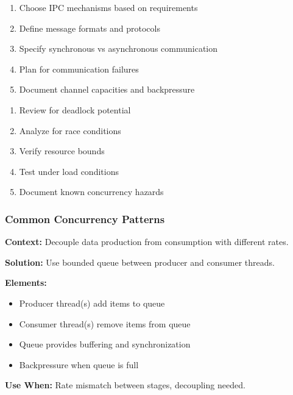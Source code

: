 \documentclass[11pt,letterpaper]{article}
\begin{document}
\begin{guidancebox}
\begin{enumerate}[nosep]
    \item Choose IPC mechanisms based on requirements
    \item Define message formats and protocols
    \item Specify synchronous vs asynchronous communication
    \item Plan for communication failures
    \item Document channel capacities and backpressure
\end{enumerate}
\end{guidancebox}

\begin{guidancebox}
\begin{enumerate}[nosep]
    \item Review for deadlock potential
    \item Analyze for race conditions
    \item Verify resource bounds
    \item Test under load conditions
    \item Document known concurrency hazards
\end{enumerate}
\end{guidancebox}

\subsubsection{Common Concurrency Patterns}

\begin{patternbox}
\textbf{Context:} Decouple data production from consumption with different rates.

\textbf{Solution:} Use bounded queue between producer and consumer threads.

\textbf{Elements:}
\begin{itemize}[nosep]
    \item Producer thread(s) add items to queue
    \item Consumer thread(s) remove items from queue
    \item Queue provides buffering and synchronization
    \item Backpressure when queue is full
\end{itemize}

\textbf{Use When:} Rate mismatch between stages, decoupling needed.
\end{patternbox}
\end{document}
